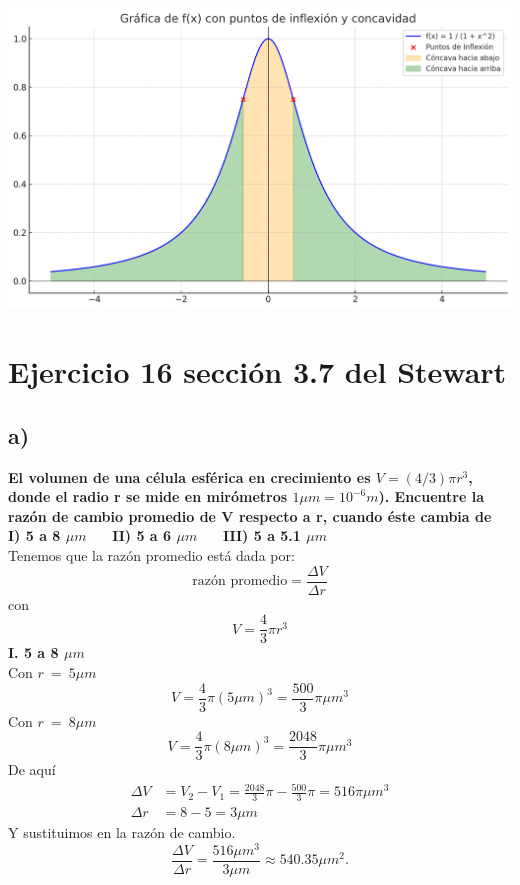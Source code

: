 \documentclass[11pt,letterpaper]{article}
\begin{document}
\begin{center}
    \includegraphics[width=17cm]{./imagenes/grafica.png}
\end{center}

\section*{Ejercicio 16 sección 3.7 del Stewart}
\subsection*{a)}
\textbf{El volumen de una célula esférica en crecimiento es $V=(4/3) \pi r^3$, donde el radio r se mide en mirómetros $1\mu m = 10^{-6}m$). Encuentre la razón de cambio promedio de V respecto a r, cuando éste cambia de} \\
\textbf{I) 5 a 8 $\mu m$} \ \ \ \textbf{II) 5 a 6 $\mu m$} \ \ \ \textbf{III) 5 a 5.1 $\mu m$}\\
Tenemos que la razón promedio está dada por:
\begin{equation*}
  \text{razón promedio}=\frac{\Delta V}{\Delta r}
\end{equation*}
con
\begin{equation*}
  V=\frac{4}{3}\pi r^3
\end{equation*}
\textbf{I. 5 a 8 $\mu m$}\\
Con $r \ = \ 5\mu m$
\begin{equation*}
  V=\frac{4}{3}\pi (5\mu m)^3=\frac{500}{3}\pi\mu m ^3
\end{equation*}
Con $r \ = \ 8 \mu m $
\begin{equation*}
  V=\frac{4}{3}\pi (8\mu m)^3=\frac{2048}{3}\pi\mu m ^3
\end{equation*}
De aquí
\begin{equation*}
  \begin{split}
    \Delta V &= V_2-V_1=\frac{2048}{3}\pi-\frac{500}{3}\pi=516\pi \mu m^3 \\
    \Delta r &= 8-5 = 3 \mu m
  \end{split}
\end{equation*}
Y sustituimos en la razón de cambio.
\begin{equation*}
  \frac{\Delta V}{\Delta r}=\frac{516\mu m^3}{3 \mu m}\approx 540.35\mu m^2.
\end{equation*}
\end{document}
